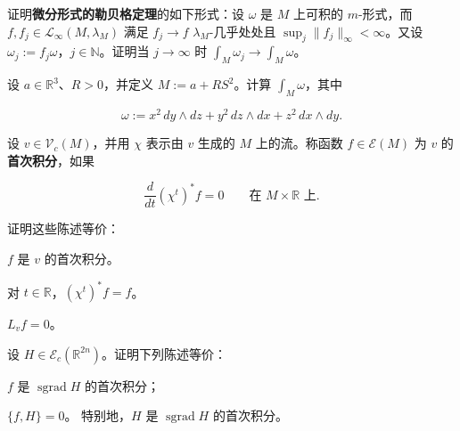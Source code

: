 \exerciseshead

\begin{exercises}
\item

证明\textbf{微分形式的勒贝格定理}的如下形式：设 $ \omega $ 是 $ M $ 上可积的 $ m $-形式，而 $ f, f_j \in \mathcal{L}_\infty(M, \lambda_M) $ 满足 $ f_j \to f $ $ \lambda_M $-几乎处处且 $ \sup_j \|f_j\|_\infty < \infty $。又设 $ \omega_j := f_j\omega $，$ j \in \mathbb{N} $。证明当 $ j \to \infty $ 时 $ \int_M \omega_j \to \int_M \omega $。

\item

设 $ a \in \mathbb{R}^3 $、$ R > 0 $，并定义 $ M := a + RS^2 $。计算 $ \int_M \omega $，其中

\[
\omega := x^2\,dy \wedge dz + y^2\,dz \wedge dx + z^2\,dx \wedge dy .
\]
\item

设 $ v \in \mathcal{V}_c(M) $，并用 $ \chi $ 表示由 $ v $ 生成的 $ M $ 上的流。称函数 $ f \in \mathcal{E}(M) $ 为 $ v $ 的\textbf{首次积分}，如果

\[
\frac{d}{dt}(\chi^t)^*f = 0 \qquad \text{在 } M \times \mathbb{R} \text{ 上} .
\]

证明这些陈述等价：

\begin{subitems}
\item

$ f $ 是 $ v $ 的首次积分。

\item

对 $ t \in \mathbb{R} $，$ (\chi^t)^*f = f $。

\item

$ L_v f = 0 $。

\end{subitems}

\item

设 $ H \in \mathcal{E}_c(\mathbb{R}^{2n}) $。证明下列陈述等价：

\begin{subitems}
\item

$ f $ 是 $ \operatorname{sgrad} H $ 的首次积分；

\item

$ \{f, H\} = 0 $。
特别地，$ H $ 是 $ \operatorname{sgrad} H $ 的首次积分。

\end{subitems}


\end{exercises}

